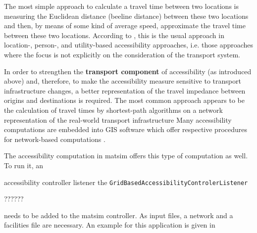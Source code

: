The most simple approach to calculate a travel time 
between two locations is measuring the Euclidean distance (beeline distance) between these two locations and then, 
by means of some kind of average speed, approximate the travel time between these two locations. According to 
\citet{Geurs2004AccessibilityReview}, this is the usual approach in location-, person-, and utility-based accessibility 
approaches, i.e. those approaches where the focus is not explicitly on the consideration of the transport system.


In order to strengthen the \textbf{transport component} of accessibility (as introduced above) and, therefore, to make 
the accessibility measure sensitive to transport infrastructure changes, a better representation of the travel 
impedance between origins and destinations is required. The most common approach appears to be the calculation of travel 
times by shortest-path algorithms on a network representation of the real-world transport infrastructure
Many accessibility computations are embedded into GIS software which offer respective procedures for network-based 
computations \citep{BBSR20xxErreichbarkeitsmodell}.



The accessibility computation in \gls{matsim} offers this type of computation as well. To run it, an 

accessibility controller listener \eg the \texttt{GridBasedAccessibilityControlerListener}

??????

needs to be added to the \gls{matsim} controller. As input files, a network and a 
facilities file are necessary. An example for this application is given in 

